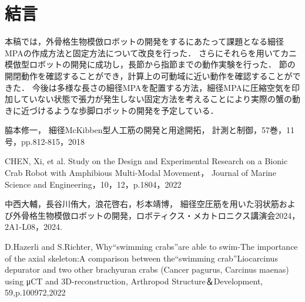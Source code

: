\documentclass{jarticle}
\begin{document}

\section{結言}
本稿では，外骨格生物模倣ロボットの開発をするにあたって課題となる細径MPAの作成方法と固定方法について改良を行った．
さらにそれらを用いてカニ模倣型ロボットの開発に成功し，長節から指節までの動作実験を行った．
節の開閉動作を確認することができ，計算上の可動域に近い動作を確認することができた．
今後は多様な長さの細径MPAを配置する方法，細径MPAに圧縮空気を印加していない状態で張力が発生しない固定方法を考えることにより実際の蟹の動きに近づけるような歩脚ロボットの開発を予定している．

\begin{thebibliography}{99}
  脇本修一，
  細径McKibben型人工筋の開発と用途開拓，
  計測と制御，57巻，11号，pp.812-815，2018
  
  CHEN, Xi, et al. Study on the Design and Experimental Research on a Bionic Crab Robot with Amphibious Multi-Modal Movement， Journal of Marine Science and Engineering，10，12，p.1804，2022
  
  中西大輔，長谷川侑大，浪花啓右，杉本靖博，
  細径空圧筋を用いた羽状筋および外骨格生物模倣ロボットの開発，ロボティクス・メカトロニクス講演会2024，2A1-L08，2024.

  D.Hazerli and S.Richter,
  Why“swimming crabs”are able to swim-The importance of the axial skeleton:A comparison between the“swimming crab”Liocarcinus depurator and two other brachyuran crabs (Cancer pagurus, Carcinus maenas) using μCT and 3D-reconstruction,
  Arthropod Structure＆Development,
  59,p.100972,2022

\end{thebibliography}
\end{document}
